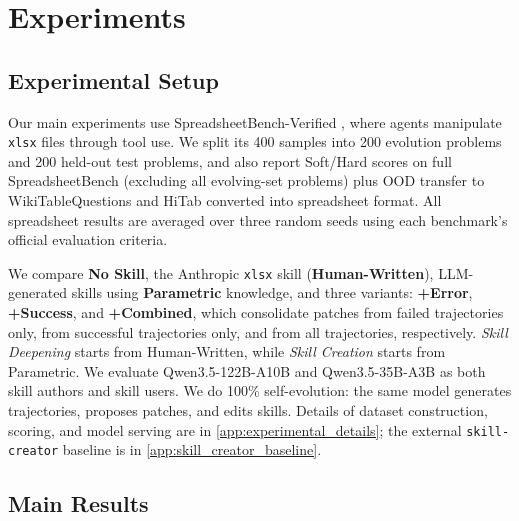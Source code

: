 

\section{Experiments}
\label{sec:experiments}

\subsection{Experimental Setup}
\label{sec:experiments:setup}

Our main experiments use SpreadsheetBench-Verified \citep{ma2024spreadsheetbenchchallengingrealworld}, where agents manipulate \texttt{xlsx} files through tool use.
We split its 400 samples into 200 evolution problems and 200 held-out test problems, and also report Soft/Hard scores on full SpreadsheetBench (excluding all evolving-set problems) plus OOD transfer to WikiTableQuestions \citep{pasupat2015compositionalsemanticparsingsemistructured} and HiTab \citep{cheng-etal-2022-hitab} converted into spreadsheet format.
All spreadsheet results are averaged over three random seeds using each benchmark's official evaluation criteria.

We compare \textbf{No Skill}, the Anthropic \texttt{xlsx} skill (\textbf{Human-Written}), LLM-generated skills using \textbf{Parametric} knowledge, and three \systemname{} variants: \textbf{+Error}, \textbf{+Success}, and \textbf{+Combined}, which consolidate patches from failed trajectories only, from successful trajectories only, and from all trajectories, respectively.
\textit{Skill Deepening} starts from Human-Written, while \textit{Skill Creation} starts from Parametric.
We evaluate Qwen3.5-122B-A10B and Qwen3.5-35B-A3B as both skill authors and skill users. We do 100\% self-evolution: the same model generates trajectories, proposes patches, and edits skills.
Details of dataset construction, scoring, and model serving are in \cref{app:experimental_details}; the external \texttt{skill-creator} baseline is in \cref{app:skill_creator_baseline}.

\subsection{Main Results}
\label{sec:experiments:main}

